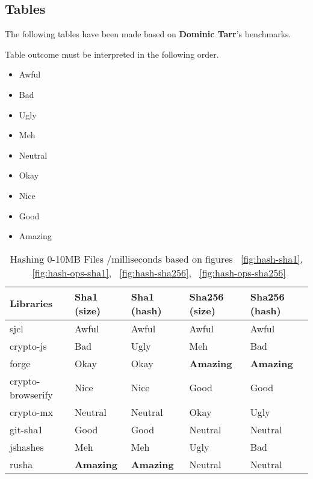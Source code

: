
\subsection{Tables}
The following tables have been made based on \textbf{Dominic Tarr}'s\cite {Tarr2014PerformanceLibraries.} benchmarks.

Table outcome must be interpreted in the following order.
\begin{multicols}{2}
\begin{itemize}
\item Awful
\item Bad
\item Ugly
\item Meh
\item Neutral
\item Okay
\item Nice
\item Good
\item Amazing
\end{itemize}
\end{multicols}

\begin{table}[htpb]
\centering
\caption{Hashing 0-10MB Files /milliseconds based on figures ~\ref{fig:hash-sha1}, ~\ref{fig:hash-ops-sha1}, ~\ref{fig:hash-sha256}, ~\ref{fig:hash-ops-sha256}}
\label{tab:hashing-0-10mb-files}
\begin{adjustbox}{center, width=\columnwidth-20pt}
\begin{tabular}{|l|l|l|l|l|}
\hline
Libraries & Sha1 (size) & Sha1 (hash) & Sha256 (size) & Sha256 (hash)	\\ \hline
sjcl				& Awful	& Awful	& Awful	& Awful	\\ \hline
crypto-js			& Bad	& Ugly	& Meh	& Bad		\\ \hline
forge				& Okay	& Okay	& \textbf{Amazing}	& \textbf{Amazing}	\\ \hline
crypto-browserify	& Nice	& Nice	& Good	& Good		\\ \hline
crypto-mx           & Neutral	& Neutral	& Okay	& Ugly	\\ \hline
git-sha1            & Good	& Good	& Neutral	& Neutral		\\ \hline
jshashes            & Meh	& Meh	& Ugly	& Bad		\\ \hline
rusha               & \textbf{Amazing}	& \textbf{Amazing}	& Neutral	& Neutral		\\ \hline
\end{tabular}
\end{adjustbox}
\end{table}

